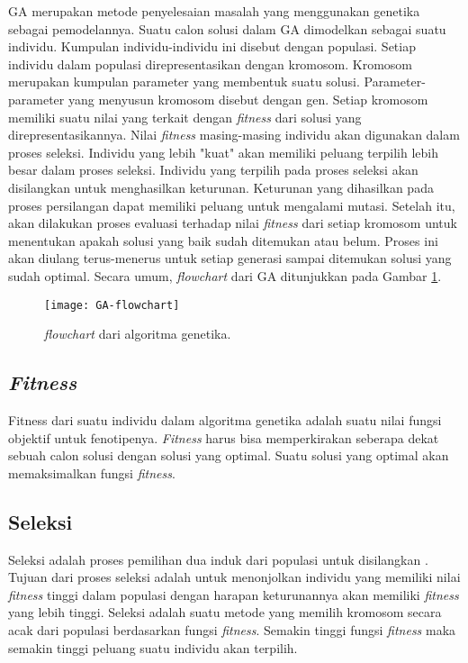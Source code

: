 GA merupakan metode penyelesaian masalah yang menggunakan genetika sebagai pemodelannya. Suatu calon solusi dalam GA dimodelkan sebagai suatu individu. Kumpulan individu-individu ini disebut dengan populasi. Setiap individu dalam populasi direpresentasikan dengan kromosom. Kromosom merupakan kumpulan parameter yang membentuk suatu solusi. Parameter-parameter yang menyusun kromosom disebut dengan gen. Setiap kromosom memiliki suatu nilai yang terkait dengan \textit{fitness} dari solusi yang direpresentasikannya. Nilai \textit{fitness} masing-masing individu akan digunakan dalam proses seleksi. Individu yang lebih "kuat" akan memiliki peluang terpilih lebih besar dalam proses seleksi. Individu yang terpilih pada proses seleksi akan disilangkan untuk menghasilkan keturunan. Keturunan yang dihasilkan pada proses persilangan dapat memiliki peluang untuk mengalami mutasi. Setelah itu, akan dilakukan proses evaluasi terhadap nilai \textit{fitness} dari setiap kromosom untuk menentukan apakah solusi yang baik sudah ditemukan atau belum. Proses ini akan diulang terus-menerus untuk setiap generasi sampai ditemukan solusi yang sudah optimal. Secara umum, \textit{flowchart} dari GA ditunjukkan pada Gambar \ref{fig:GA-flowchart}.

\begin{figure}[h]
	\centering
	\texttt{[image: GA-flowchart]}
	\caption{\textit{flowchart} dari algoritma genetika.}
	\label{fig:GA-flowchart}
\end{figure}

\subsection{\textit{Fitness}}
\label{sub:fitness}
Fitness dari suatu individu dalam algoritma genetika adalah suatu nilai fungsi objektif untuk fenotipenya\cite{sivanandam2007introduction}. \textit{Fitness} harus bisa memperkirakan seberapa dekat sebuah calon solusi dengan solusi yang optimal. Suatu solusi yang optimal akan memaksimalkan fungsi \textit{fitness}. 

\subsection{Seleksi}
\label{sub:selection}
Seleksi adalah proses pemilihan dua induk dari populasi untuk disilangkan \cite{sivanandam2007introduction}. Tujuan dari proses seleksi adalah untuk menonjolkan individu yang memiliki nilai \textit{fitness} tinggi dalam populasi dengan harapan keturunannya akan memiliki \textit{fitness} yang lebih tinggi. Seleksi adalah suatu metode yang memilih kromosom secara acak dari populasi berdasarkan fungsi \textit{fitness}. Semakin tinggi fungsi \textit{fitness} maka semakin tinggi peluang suatu individu akan terpilih. 

